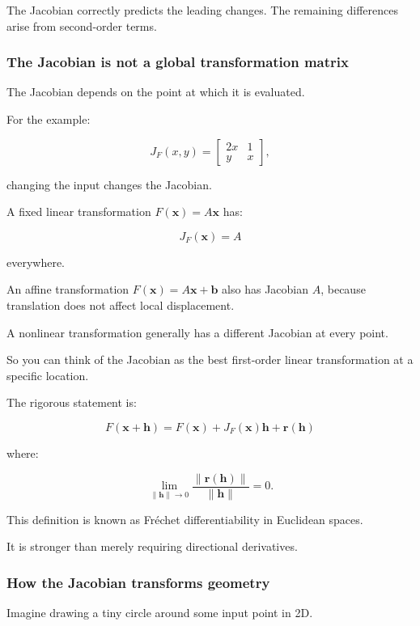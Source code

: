 The Jacobian correctly predicts the leading changes. The remaining differences arise from second-order terms.

\subsubsection{The Jacobian is not a global transformation matrix}\label{02-foundations-ii-ch021-the-jacobian-is-not-a-global-transformation-matrix}

The Jacobian depends on the point at which it is evaluated.

For the example:

\[
J_F(x,y)= \begin{bmatrix}2x&1\\y&x\end{bmatrix},
\]

changing the input changes the Jacobian.

A fixed linear transformation \(F(\mathbf x)=A\mathbf x\) has:

\[
J_F(\mathbf x)=A
\]

everywhere.

An affine transformation \(F(\mathbf x)=A\mathbf x+\mathbf b\) also has Jacobian \(A\), because translation does not affect local displacement.

A nonlinear transformation generally has a different Jacobian at every point.

So you can think of the Jacobian as the best first-order linear transformation at a specific location.

The rigorous statement is:

\[
F(\mathbf x+\mathbf h) = F(\mathbf x)+J_F(\mathbf x)\mathbf h+\mathbf r(\mathbf h)
\]

where:

\[
\lim_{\|\mathbf h\|\to0} \frac{\|\mathbf r(\mathbf h)\|}{\|\mathbf h\|}=0.
\]

This definition is known as Fréchet differentiability in Euclidean spaces.

It is stronger than merely requiring directional derivatives.

\subsubsection{How the Jacobian transforms geometry}\label{02-foundations-ii-ch021-how-the-jacobian-transforms-geometry}

Imagine drawing a tiny circle around some input point in 2D.

